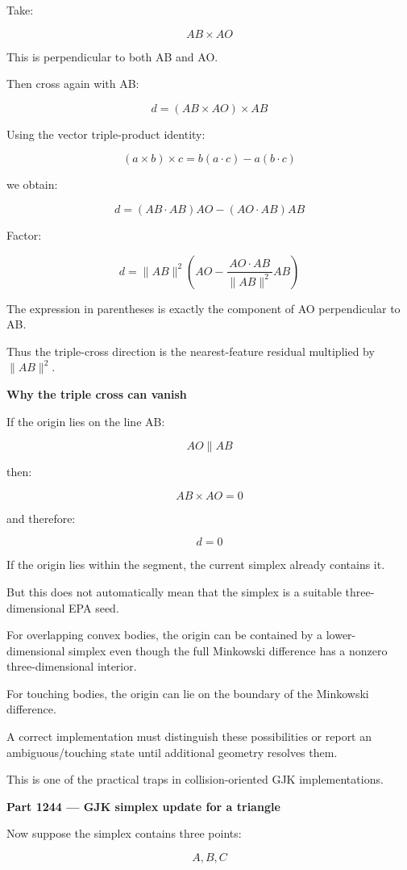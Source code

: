 Take:

\[
AB\times AO
\]

This is perpendicular to both AB and AO.

Then cross again with AB:

\[
\boxed{ d=(AB\times AO)\times AB }
\]

Using the vector triple-product identity:

\[
(a\times b)\times c = b(a\cdot c)-a(b\cdot c)
\]

we obtain:

\[
d=(AB\cdot AB)AO-(AO\cdot AB)AB
\]

Factor:

\[
\boxed{ d=\|AB\|^2 \left( AO-\frac{AO\cdot AB}{\|AB\|^2}AB \right) }
\]

The expression in parentheses is exactly the component of AO perpendicular to AB.

Thus the triple-cross direction is the nearest-feature residual multiplied by \(\|AB\|^2\).

\textbf{Why the triple cross can vanish}

If the origin lies on the line AB:

\[
AO\parallel AB
\]

then:

\[
AB\times AO=0
\]

and therefore:

\[
d=0
\]

If the origin lies within the segment, the current simplex already contains it.

But this does not automatically mean that the simplex is a suitable three-dimensional EPA seed.

For overlapping convex bodies, the origin can be contained by a lower-dimensional simplex even though the full Minkowski difference has a nonzero three-dimensional interior.

For touching bodies, the origin can lie on the boundary of the Minkowski difference.

A correct implementation must distinguish these possibilities or report an ambiguous/touching state until additional geometry resolves them.

This is one of the practical traps in collision-oriented GJK implementations.

\textbf{Part 1244 --- GJK simplex update for a triangle}

Now suppose the simplex contains three points:

\[
A,B,C
\]

